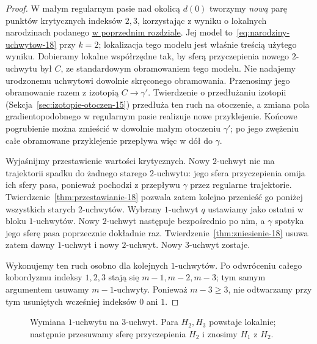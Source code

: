 \begin{proof}
W małym regularnym pasie nad okolicą $d(0)$ tworzymy
\emph{nową} parę punktów krytycznych indeksów $2,3$,
korzystając z wyniku o lokalnych narodzinach podanego
\hyperref[sec:narodziny-lokalne-23]{w poprzednim rozdziale}.
Jej model to~\eqref{eq:narodziny-uchwytow-18} przy $k=2$;
lokalizacja tego modelu jest właśnie treścią użytego wyniku.
Dobieramy lokalne współrzędne tak, by sferą przyczepienia nowego
$2$-uchwytu był $C$, ze standardowym obramowaniem tego modelu.
Nie nadajemy urodzonemu uchwytowi dowolnie skręconego obramowania.
Przenosimy jego obramowanie razem z izotopią $C\to\gamma'$.
Twierdzenie o przedłużaniu izotopii
(Sekcja~\ref{sec:izotopie-otoczen-15}) przedłuża ten ruch na
otoczenie, a zmiana pola gradientopodobnego w regularnym pasie
realizuje nowe przyklejenie. Końcowe pogrubienie można zmieścić
w dowolnie małym otoczeniu $\gamma'$; po jego zwężeniu
całe obramowane przyklejenie przepływa więc w dół do $\gamma$.

Wyjaśnijmy przestawienie wartości krytycznych. Nowy $2$-uchwyt
nie ma trajektorii spadku do żadnego starego $2$-uchwytu:
jego sfera przyczepienia omija ich sfery pasa, ponieważ pochodzi
z przepływu $\gamma$ przez regularne trajektorie.
Twierdzenie~\ref{thm:przestawianie-18} pozwala zatem kolejno
przenieść go poniżej wszystkich starych $2$-uchwytów.
Wybrany $1$-uchwyt $q$ ustawiamy jako ostatni w bloku
$1$-uchwytów. Nowy $2$-uchwyt następuje bezpośrednio po nim,
a $\gamma$ spotyka jego sferę pasa poprzecznie dokładnie raz.
Twierdzenie~\ref{thm:zniesienie-18}
usuwa zatem dawny
$1$-uchwyt i nowy
$2$-uchwyt. Nowy
$3$-uchwyt zostaje.

Wykonujemy ten ruch osobno
dla kolejnych $1$-uchwytów.
Po odwróceniu całego
kobordyzmu indeksy
$1,2,3$ stają się
$m-1,m-2,m-3$;
tym samym argumentem
usuwamy $m-1$-uchwyty. Ponieważ $m-3\geq3$, nie odtwarzamy
przy tym usuniętych wcześniej indeksów $0$ ani $1$.
\end{proof}

\begin{figure}[htbp]
\centering
{}
\caption{Wymiana $1$-uchwytu na $3$-uchwyt.
Para $H_2,H_3$ powstaje lokalnie; następnie
przesuwamy sferę przyczepienia $H_2$
i znosimy $H_1$ z $H_2$.}
\label{fig:wymiana-1-na-3-19}
\end{figure}

